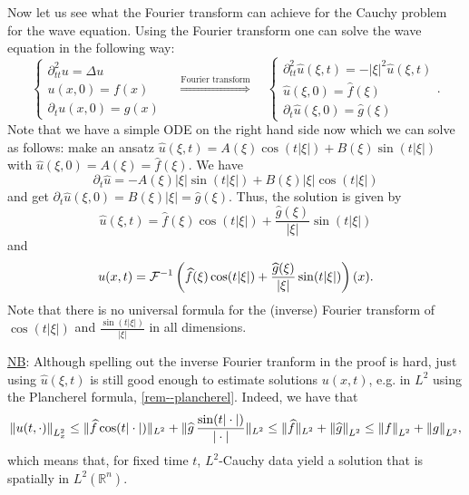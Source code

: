 \documentclass[11pt]{article}
\begin{document}
					Now let us see what the Fourier transform can achieve for the Cauchy problem for the wave equation.
					Using the Fourier transform one can solve the wave equation in the following way:
					\begin{equation*}
						\begin{cases}
							\partial_{tt}^2u=\Delta u\\
							u(x,0)=f(x)\\
							\partial_tu(x,0)=g(x)
						\end{cases}\quad\overset{\text{Fourier transform}}{\Longrightarrow}\quad
						\begin{cases}
							\partial_{tt}^2\hat{u}(\xi,t)=-|\xi|^2\hat{u}(\xi,t)\\
							\hat{u}(\xi,0)=\hat{f}(\xi)\\
							\partial_t\hat{u}(\xi,0)=\hat{g}(\xi)
						\end{cases}.
					\end{equation*}
					Note that we have a simple ODE on the right hand side now which we can solve as follows: make an ansatz $\hat{u}(\xi,t)=A(\xi)\cos(t|\xi|)+B(\xi)\sin(t|\xi|)$ with $\hat{u}(\xi,0)=A(\xi)=\hat{f}(\xi)$. We have
					\begin{equation*}
						\partial_t\hat{u}=-A(\xi)|\xi|\sin(t|\xi|)+B(\xi)|\xi|\cos(t|\xi|)
					\end{equation*}
					and get $\partial_t\hat{u}(\xi,0)=B(\xi)|\xi|=\hat{g}(\xi)$. Thus, the solution is given by
					\begin{equation*}
						\hat{u}(\xi,t)=\hat{f}(\xi)\cos(t|\xi|)+\frac{\hat{g}(\xi)}{|\xi|}\sin(t|\xi|)
					\end{equation*}
					and
					\begin{equation*}
						u(x,t)=\mathcal{F}^{-1}\left(\widehat{f}(\xi)\cos(t|\xi|)+\frac{\widehat{g}(\xi)}{|\xi|}\sin(t|\xi|)\right)(x).
					\end{equation*}
					Note that there is no universal formula for the (inverse) Fourier transform of $\cos(t|\xi|)$ and $\frac{\sin(t|\xi|)}{|\xi|}$ in all dimensions.
			

				\noindent\underline{NB}: Although spelling out the inverse Fourier tranform in the proof is hard, just using $\hat{u}(\xi,t)$ is still good enough to estimate solutions $u(x,t)$, e.g. in $L^2$ using the Plancherel formula, \autoref{rem--plancherel}. Indeed, we have that
				\begin{equation*}
					\norm{u(t, \cdot)}_{L^2_{x}}\le\|\widehat{f}\cos(t|\cdot|)\|_{L^2}+
				\|\widehat{g}\,\frac{\sin(t|\cdot|)}{|\cdot|}\|_{L^2}\le\|\widehat{f}\|_{L^2}+\norm{\widehat{g}}_{L^2}\le\norm{f}_{L^2}+\norm{g}_{L^2},
				\end{equation*}
                which means that, for fixed time $t$, $L^2$-Cauchy data yield a solution that is spatially in $L^2(\mathbb{R}^n).$
\end{document}
